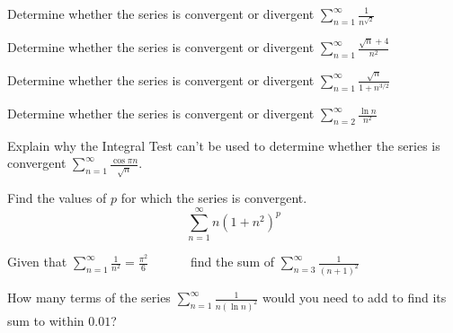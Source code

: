 \documentclass[
  course = {{MATH102 Calculus II}},
  quartile = {{2}},
  assignment = 20,%
  topic = {{11.3: The Integral Test}},
  firstexercise = 1,
  term = 202
]{aga-homework}
\begin{document}
\newpage

\problem Determine whether the series is convergent or divergent
$\displaystyle \sum_{n=1}^{\infty}\frac{1}{n^{\sqrt{2}}}$

\newpage

\problem Determine whether the series is convergent or divergent
$\displaystyle \sum_{n=1}^{\infty}\frac{\sqrt{n}+4}{n^{2}}$

\newpage

\problem Determine whether the series is convergent or divergent
$\displaystyle \sum_{n=1}^{\infty}\frac{\sqrt{n}}{1+n^{3/2}}$

\newpage

\problem Determine whether the series is convergent or divergent
$\displaystyle \sum_{n=2}^{\infty}\frac{\ln n}{n^{2}}$

\newpage

\problem  Explain why the Integral Test can’t be used to determine whether the series is convergent $\displaystyle \sum_{n=1}^{\infty}\frac{\cos \pi n}{\sqrt{n}}$.

\newpage

\problem Find the values of $p$ for which the series is convergent. \\
$$\displaystyle \sum_{n=1}^{\infty}n(1+n^2)^p$$

\newpage

\problem Given that $\displaystyle \sum_{n=1}^{\infty}\frac{1}{n^2}=\frac{\pi^2}{6}\qquad \quad$
find the sum of   
$\displaystyle \sum_{n=3}^{\infty}\frac{1}{(n+1)^2}$

\newpage

\problem How many terms of the series $\displaystyle \sum_{n=1}^{\infty}\frac{1}{n(\ln n)^2}$ would you need to add to find its sum to within $0.01$?
\newpage

\afterpage{\null\newpage}

\afterpage{\null\newpage}

\afterpage{\null\newpage}
\end{document}
